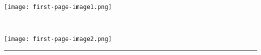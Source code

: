 %
%
%
%

\clearpage
\thispagestyle{empty}

\texttt{[image: first-page-image1.png]}

\vspace{2.0cm}

{\setmainfont{Liberation Sans}
\textcolor{ps-darkblue}{%
	{\fontsize{30}{36}\selectfont \textbf{\doctitle}\\}
}}

\vspace{0.4cm}

{\setmainfont{Liberation Sans}
\textcolor{ps-darkblue}{%
	{\fontsize{16}{19}\selectfont \textbf{\docauthor}}
}}

\vspace{2.25cm}

\begin{flushright}
	\texttt{[image: first-page-image2.png]}
\end{flushright}

\vspace{\fill}

\begin{center}
	\color{ps-orange}\rule{\textwidth}{2pt}
\end{center}

\vspace{0.15cm}

{\setmainfont{Liberation Sans}
\fontsize{10}{12}\selectfont
\textcolor{ps-lightblue}{%
	\makebox[\textwidth][l]{\hspace{0.2cm}\docversion\hfill \docdate\hspace{0.2cm}}
}}
\clearpage
\pagestyle{plain}

